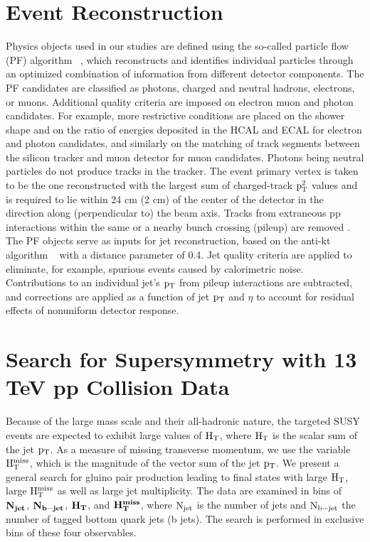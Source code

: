 \section{Event Reconstruction }
Physics objects used in our studies are defined using the so-called particle flow (PF) algorithm ~\cite{Beaudette:2014cea}, which reconstructs
and identifies individual particles through an optimized combination of information from different
detector components. The PF candidates are classified as photons, charged and
neutral hadrons, electrons, or muons. Additional quality criteria are imposed on electron
muon and photon candidates. For example, more restrictive conditions are placed on the
shower shape and on the ratio of energies deposited in the HCAL and ECAL for electron and photon candidates,
and similarly on the matching of track segments between the silicon tracker and muon detector
for muon candidates. Photons being neutral particles do not produce tracks in the tracker. The event primary vertex is taken to be the one reconstructed with the
largest sum of charged-track $\rm p_{T}^{2}$ values and is required to lie within 24 cm (2 cm) of the center of
the detector in the direction along (perpendicular to) the beam axis. Tracks from extraneous
pp interactions within the same or a nearby bunch crossing (pileup) are removed .
The PF objects serve as inputs for jet reconstruction, based on the anti-kt algorithm ~\cite{Cacciari:2008gp}  with
a distance parameter of 0.4. Jet quality criteria are applied to eliminate,
for example, spurious events caused by calorimetric noise. Contributions to an individual jet’s
$\rm p_{T}$ from pileup interactions are subtracted, and corrections are applied as a function of jet
$\rm p_{T}$ and $\eta$ to account for residual effects of nonuniform detector response.

\section{ Search for Supersymmetry with 13 TeV pp Collision Data}




Because of the large mass scale and their all-hadronic nature, the targeted SUSY events are expected to exhibit large values of $\rm H_{T}$,
where $\rm H_{T}$ is the scalar sum of the jet $\rm p_{T}$. As a measure of missing
transverse momentum, we use the variable $\rm H_{T}^{miss}$, which is the magnitude of the vector sum of
the jet $\rm p_{T}$. We present a general search for gluino pair production leading to final states with
large $\rm H_{T}$, large $\rm H_{T}^{miss}$ as well as large jet multiplicity. The data are examined in bins of $ \rm \bf{ N_{jet}}$, $ \rm \bf{ N_{b-jet}}$, $ \rm \bf{ H_{T}}$,
and $ \rm \bf{H_{T}^{miss}}$, where $\rm N_{jet}$ is the number of jets and $\rm N_{b-jet}$ the number of tagged bottom quark jets
(b jets). The search is performed in exclusive bins of these four observables.


